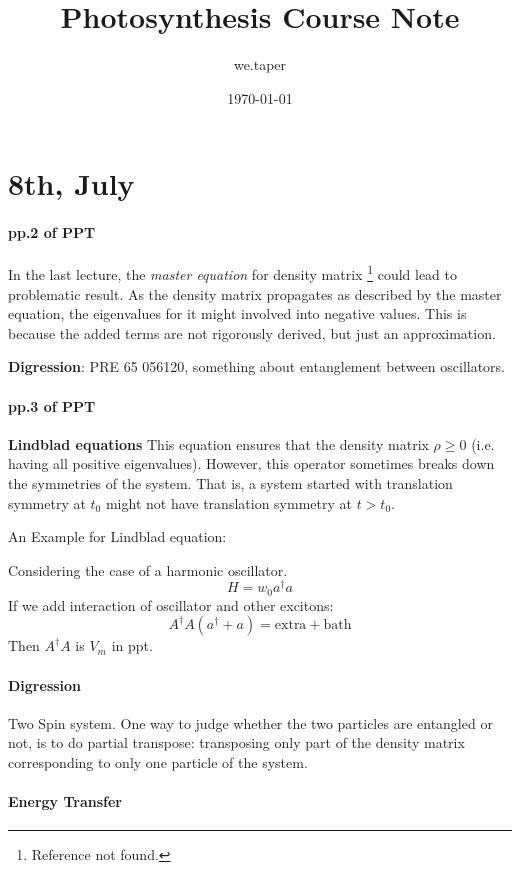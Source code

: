 \documentclass{article}
\title{Photosynthesis Course Note}
\date{\today}
\author{we.taper}
\numberwithin{equation}{subsection} %
\theoremstyle{definition}
\begin{document}
\maketitle

\tableofcontents

\section{8th, July}
\label{sec:8th_July}
\paragraph{pp.2 of PPT}
In the last lecture, the \textit{master equation} for density matrix
\footnote{Reference not found.}
could lead to problematic result. As the density matrix propagates
as described by the master equation, the eigenvalues for it might
involved into negative values. This is because the added terms
are not rigorously derived, but just an approximation.

\textbf{Digression}:  PRE 65 056120, something about entanglement between
oscillators.

\paragraph{pp.3 of PPT}
\textbf{Lindblad equations} This equation ensures that the
density matrix $\rho \geq 0$ (i.e. having all positive
eigenvalues). However, this operator sometimes breaks down
the symmetries of the system. That is, a system started with
translation symmetry at $t_0$ might not have translation
symmetry at $t > t_0$.

An Example for Lindblad equation:

Considering the case of a harmonic oscillator.
$$ H = w_0 a^\dagger a $$
If we add interaction of oscillator and other excitons:
$$ A^\dagger A (a^\dagger + a) = \text{extra} + \text{bath}$$
Then $A^\dagger A$ is $V_m$ in ppt.


\paragraph{Digression} Two Spin system. One way to judge
whether the two particles are entangled or not, is to do partial
transpose: transposing only part of the density
matrix corresponding to only one particle of the system.

\paragraph{Energy Transfer}
\end{document}
